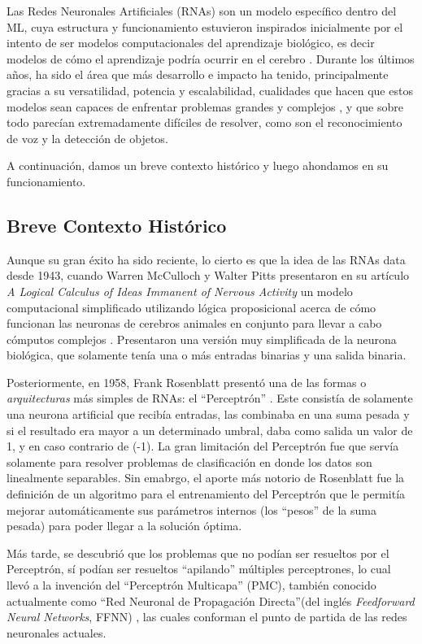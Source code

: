 \documentclass[../../main.tex]{subfiles}
\begin{document}
Las Redes Neuronales Artificiales (RNAs) son un modelo específico dentro del ML, cuya
estructura y funcionamiento estuvieron inspirados inicialmente por el intento de ser
modelos computacionales del aprendizaje biológico, es decir modelos de cómo el aprendizaje
podría ocurrir en el cerebro \cite{deep-learning}. Durante los últimos años, ha sido el
área que más desarrollo e impacto ha tenido, principalmente gracias a su versatilidad,
potencia y escalabilidad, cualidades que hacen que estos modelos sean capaces de
enfrentar problemas grandes y complejos \cite{hands-on-ML-sklearn-tf}, y que sobre todo
parecían extremadamente difíciles de resolver, como son el reconocimiento de voz y la
detección de objetos.

A continuación, damos un breve contexto histórico y luego ahondamos en su funcionamiento.

\subsection{Breve Contexto Histórico}
Aunque su gran éxito ha sido reciente, lo cierto es que la idea de las RNAs data desde
1943, cuando Warren McCulloch y Walter Pitts presentaron en su artículo \textit{A Logical
Calculus of Ideas Immanent of Nervous Activity} \cite{mculloch-pitts-1943} un modelo
computacional simplificado utilizando lógica proposicional acerca de cómo funcionan las
neuronas de cerebros animales en conjunto para llevar a cabo cómputos complejos
\cite{hands-on-ML-sklearn-tf}. Presentaron una versión muy simplificada de la neurona
biológica, que solamente tenía una o más entradas binarias y una salida binaria.

Posteriormente, en 1958, Frank Rosenblatt presentó una de las formas o
\textit{arquitecturas} más simples de RNAs: el ``Perceptrón''
\cite{rosenblatt1958perceptron}. Este consistía de solamente una neurona artificial que
recibía entradas, las combinaba en una suma pesada y si el resultado era mayor a un
determinado umbral, daba como salida un valor de 1, y en caso contrario de (-1). La gran
limitación del Perceptrón fue que servía solamente para resolver problemas de
clasificación en donde los datos son linealmente separables. Sin emabrgo, el aporte más
notorio de Rosenblatt fue la definición de un algoritmo para el entrenamiento del
Perceptrón que le permitía mejorar automáticamente sus parámetros internos (los ``pesos''
de la suma pesada) para poder llegar a la solución óptima.

Más tarde, se descubrió que los problemas que no podían ser resueltos por el Perceptrón,
sí podían ser resueltos ``apilando'' múltiples perceptrones, lo cual llevó a la invención
del ``Perceptrón Multicapa'' (PMC), también conocido actualmente como ``Red Neuronal de
Propagación Directa''\footnotemark (del inglés \textit{Feedforward Neural Networks}, FFNN)
\cite{deep-learning}, las cuales conforman el punto de partida de las redes neuronales
actuales. 
\end{document}
